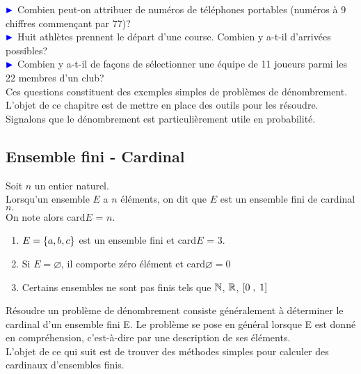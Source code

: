 


  
  
  ${\color{blue}\blacktriangleright } $  Combien peut-on attribuer de numéros de téléphones portables (numéros à 9 chiffres commençant par 77)?\\

 ${\color{blue}\blacktriangleright } $ Huit athlètes prennent le départ d'une course. Combien y a-t-il d'arrivées possibles? \\

$ {\color{blue}\blacktriangleright } $ Combien y a-t-il de façons de sélectionner une équipe de 11 joueurs parmi les 22 membres d'un club? \\

Ces questions constituent des exemples simples de problèmes de  dénombrement. \\
L'objet de ce chapitre est de mettre en place des outils pour les résoudre. \\
 Signalons que le dénombrement est particulièrement utile en probabilité. 


\subsection{Ensemble fini - Cardinal}
\begin{definition}
Soit $ n$ un entier naturel.\\
Lorsqu'un ensemble $ E $ a $ n $ éléments, on dit que $ E $ est un ensemble  fini de cardinal  $ n. $  \\
On note alors  card$ E $ = $n$. 
\end{definition}
\begin{example}
\begin{enumerate}
\item  $ E= \left\{a, b, c\right\}$ est un ensemble fini et card$ E $ = $3.$
\item Si $ E =\varnothing $, il comporte zéro élément et  card$ \varnothing =0$
\item Certains ensembles ne sont pas finis tels que $ \mathbb{N} $, $ \mathbb{R} $, $ \left[0\;,\; 1\right] $
\end{enumerate}
\end{example}
\begin{remark}

Résoudre un problème de dénombrement consiste généralement à déterminer le cardinal d'un ensemble fini E. Le problème se pose en général lorsque E est donné en compréhension, c'est-à-dire par une description de  ses éléments.  \\  L'objet de ce qui suit est de trouver des méthodes simples pour calculer des cardinaux d'ensembles finis.
\end{remark} 
